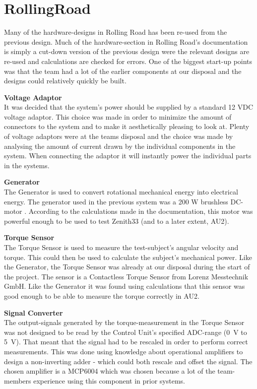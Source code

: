 \section{RollingRoad}
Many of the hardware-designs in Rolling Road has been re-used from the previous design\cite{BAC_rullefelt}. Much of the hardware-section in Rolling Road's documentation\cite{RR} is simply a cut-down version of the previous design were the relevant designs are re-used and calculations are checked for errors. One of the biggest start-up points was that the team had a lot of the earlier components at our disposal and the designs could relatively quickly be built.

\textbf{Voltage Adaptor}\\
It was decided that the system's power should be supplied by a standard 12 VDC voltage adaptor. This choice was made in order to minimize the amount of connectors to the system and to make it aesthetically pleasing to look at. Plenty of voltage adaptors were at the teams disposal and the choice was made by analysing the amount of current drawn by the individual components in the system. When connecting the adaptor it will instantly power the individual parts in the systems.

\textbf{Generator}\\
The Generator is used to convert rotational mechanical energy into electrical energy. The generator used in the previous system\cite{BAC_rullefelt} was a 200 W brushless DC-motor \cite{Maxon}. According to the calculations made in the documentation\cite{RR}, this motor was powerful enough to be used to test Zenith33\cite{BAC_zenith33} (and to a later extent, AU2).

\textbf{Torque Sensor}\\
The Torque Sensor is used to measure the test-subject's angular velocity and torque. This could then be used to calculate the subject's mechanical power. Like the Generator, the Torque Sensor was already at our disposal during the start of the project. The sensor is a Contactless Torque Sensor from Lorenz Messtechnik GmbH\cite{TorqueSensor}. Like the Generator it was found using calculations that this sensor was good enough to be able to measure the torque correctly in AU2.

\textbf{Signal Converter}\\
The output-signals generated by the torque-measurement in the Torque Sensor was not designed to be read by the Control Unit's specified ADC-range (\SI{0}{\volt} to \SI{5}{\volt}). That meant that the signal had to be rescaled in order to perform correct measurements. This was done using knowledge about operational amplifiers to design a non-inverting adder - which could both rescale and offset the signal. The chosen amplifier is a MCP6004\cite{MCP6004} which was chosen because a lot of the team-members experience using this component in prior systems.

